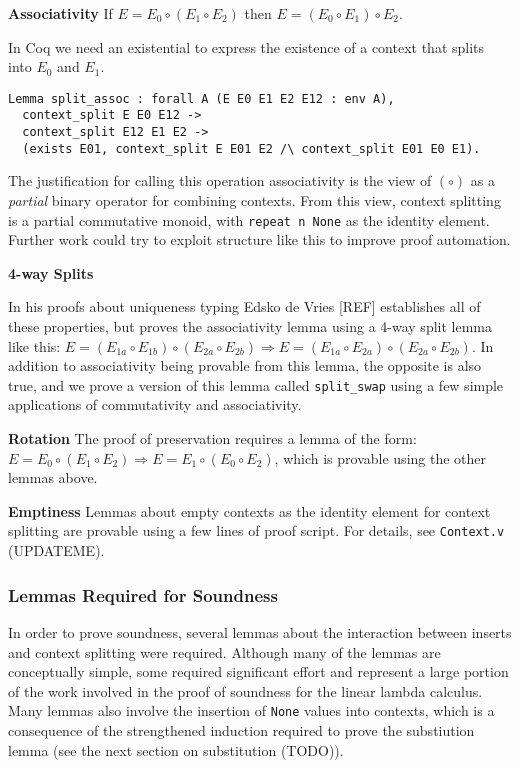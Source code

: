 \documentclass[]{unswthesis}
\let\c\texttt
\begin{document}
\textbf{Associativity} If $E = E_0 \circ (E_1 \circ E_2)$ then $E = (E_0 \circ E_1) \circ E_2$.

In Coq we need an existential to express the existence of a context that splits into $E_0$ and $E_1$.

\begin{verbatim}
Lemma split_assoc : forall A (E E0 E1 E2 E12 : env A),
  context_split E E0 E12 ->
  context_split E12 E1 E2 ->
  (exists E01, context_split E E01 E2 /\ context_split E01 E0 E1).
\end{verbatim}

The justification for calling this operation associativity is the view of $(\circ)$ as a \textit{partial} binary operator for combining contexts. From this view, context splitting is a partial commutative monoid, with \c{repeat n None} as the identity element. Further work could try to exploit structure like this to improve proof automation.

\textbf{4-way Splits}

In his proofs about uniqueness typing Edsko de Vries [REF] establishes all of these properties, but proves the associativity lemma using a 4-way split lemma like this: $E = (E_{1a} \circ E_{1b}) \circ (E_{2a} \circ E_{2b}) \Rightarrow E = (E_{1a} \circ E_{2a}) \circ (E_{2a} \circ E_{2b})$. In addition to associativity being provable from this lemma, the opposite is also true, and we prove a version of this lemma called \c{split_swap} using a few simple applications of commutativity and associativity.

\textbf{Rotation} The proof of preservation requires a lemma of the form: $E = E_0 \circ (E_1 \circ E_2) \Rightarrow E = E_1 \circ (E_0 \circ E_2)$, which is provable using the other lemmas above.

\textbf{Emptiness} Lemmas about empty contexts as the identity element for context splitting are provable using a few lines of proof script. For details, see \c{Context.v} (UPDATEME).


\subsubsection{Lemmas Required for Soundness}

In order to prove soundness, several lemmas about the interaction between inserts and context splitting were required. Although many of the lemmas are conceptually simple, some required significant effort and represent a large portion of the work involved in the proof of soundness for the linear lambda calculus. Many lemmas also involve the insertion of \c{None} values into contexts, which is a consequence of the strengthened induction required to prove the substiution lemma (see the next section on substitution (TODO)).
\end{document}

